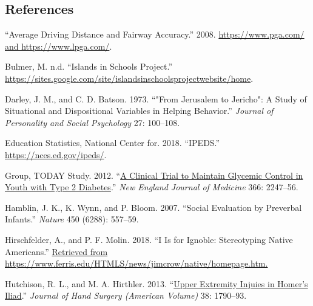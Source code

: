 \documentclass[
]{report}
\newlength{\cslhangindent}
\newlength{\cslentryspacingunit} %
\newenvironment{CSLReferences}[2] %
 {%
  \setlength{\parindent}{0pt}
  \ifodd #1
  \let\oldpar\par
  \def\par{\hangindent=\cslhangindent\oldpar}
  \fi
  \setlength{\parskip}{#2\cslentryspacingunit}
 }%
 {}
\begin{document}


\hypertarget{references}{%
\subsection*{References}\label{references}}

\hypertarget{refs}{}
\begin{CSLReferences}{1}{0}
\leavevmode{}%
{``Average Driving Distance and Fairway Accuracy.''} 2008. \href{https://www.pga.com/\%20and\%20https://www.lpga.com/}{https://www.pga.com/ and https://www.lpga.com/}.

\leavevmode{}%
Bulmer, M. n.d. {``Islands in Schools Project.''} \url{https://sites.google.com/site/islandsinschoolsprojectwebsite/home}.

\leavevmode{}%
Darley, J. M., and C. D. Batson. 1973. {``"From Jerusalem to Jericho": A Study of Situational and Dispositional Variables in Helping Behavior.''} \emph{Journal of Personality and Social Psychology} 27: 100--108.

\leavevmode{}%
Education Statistics, National Center for. 2018. {``IPEDS.''} \url{https://nces.ed.gov/ipeds/}.

\leavevmode{}%
Group, TODAY Study. 2012. {``\href{https://www.ncbi.nlm.nih.gov/pubmed/22540912}{A Clinical Trial to Maintain Glycemic Control in Youth with Type 2 Diabetes}.''} \emph{New England Journal of Medicine} 366: 2247--56.

\leavevmode{}%
Hamblin, J. K., K. Wynn, and P. Bloom. 2007. {``Social Evaluation by Preverbal Infants.''} \emph{Nature} 450 (6288): 557--59.

\leavevmode{}%
Hirschfelder, A., and P. F. Molin. 2018. {``I Is for Ignoble: Stereotyping Native Americans.''} \href{Retrieved\%20from\%20https://www.ferris.edu/HTMLS/news/jimcrow/native/homepage.htm.}{Retrieved from https://www.ferris.edu/HTMLS/news/jimcrow/native/homepage.htm.}

\leavevmode{}%
Hutchison, R. L., and M. A. Hirthler. 2013. {``\href{https://www.ncbi.nlm.nih.gov/pubmed/23932117}{Upper Extremity Injuies in Homer's Iliad}.''} \emph{Journal of Hand Surgery (American Volume)} 38: 1790--93.


\end{CSLReferences}
\end{document}
